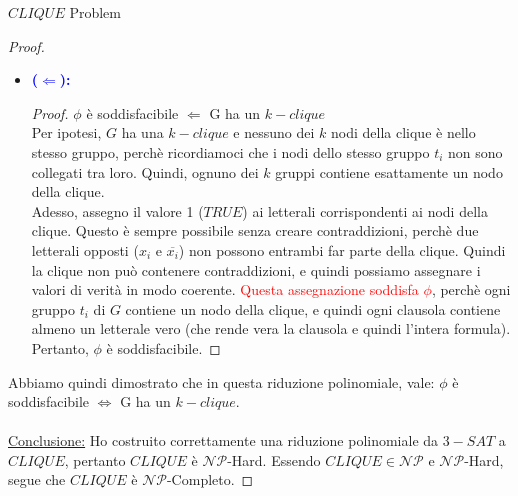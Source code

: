 \documentclass{article}  %
\theoremstyle{definition}
\begin{document}
\begin{theorem}{$CLIQUE$ Problem}
\begin{proof}
\begin{itemize}
\begin{proof}
				      scelgo arbitrariamente uno tra questi. \\ \textcolor{red}{I nodi appena selezionati formano una $k-clique$:} il numero di nodi selezionati è $k$ perchè ne abbiamo scelto
				      uno per ciascuno dei $k$ gruppi. Inoltre, ogni coppia di nodi selezionati è collegata da un arco, perché nessuna coppia rientra nelle eccezioni descritte in precedenza
				      (stesso gruppo o letterali opposti). \\
				      Pertanto, $G$ ha un $k-clique$.
			      \end{proof}
			\item \textcolor{blue}{\textbf{($\Longleftarrow$):}}
			      \begin{proof}
				      $\phi$ è soddisfacibile $\Longleftarrow$ G ha un $k-clique$ \\
				      Per ipotesi, $G$ ha una $k-clique$ e nessuno dei $k$ nodi della clique è nello stesso gruppo, perchè ricordiamoci che i nodi dello stesso gruppo $t_i$ non
				      sono collegati tra loro. Quindi, ognuno dei $k$ gruppi contiene esattamente un nodo della clique. \\
				      Adesso, assegno il valore 1 ($TRUE$) ai letterali corrispondenti ai nodi della clique.
				      Questo è sempre possibile senza creare contraddizioni, perchè due letterali opposti ($x_i$ e $\overline{x_i}$) non possono entrambi far parte della clique.
				      Quindi la clique non può contenere contraddizioni, e quindi possiamo assegnare i valori di verità in modo coerente.
				      \textcolor{red}{Questa assegnazione soddisfa $\phi$}, perchè ogni gruppo $t_i$ di $G$ contiene un nodo della clique, e quindi ogni clausola contiene
				      almeno un letterale vero (che rende vera la clausola e quindi l'intera formula). \\
				      Pertanto, $\phi$ è soddisfacibile.
			      \end{proof}
		\end{itemize}
		Abbiamo quindi dimostrato che in questa riduzione polinomiale, vale:
		$\phi$ è soddisfacibile $\iff$ G ha un $k-clique$. \\ \\

		\underline{Conclusione:} Ho costruito correttamente una riduzione polinomiale da $3-SAT$ a $CLIQUE$, pertanto $CLIQUE$ è $\mathcal{NP}$-Hard.
		Essendo $CLIQUE \in \mathcal{NP}$ e $\mathcal{NP}$-Hard, segue che $CLIQUE$ è $\mathcal{NP}$-Completo.
	\end{proof}
\end{theorem}
\end{document}
